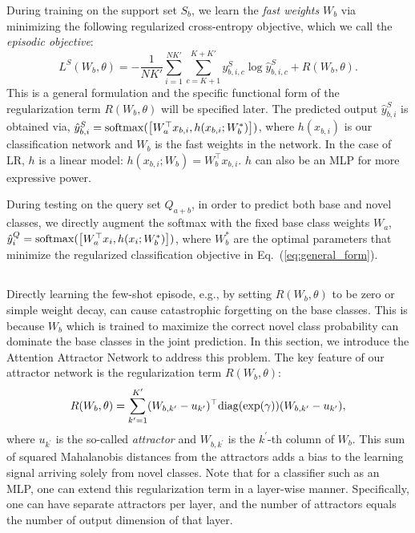 During training on the support set $S_b$, we learn the \textit{fast weights} $W_{b}$ via minimizing
the following regularized cross-entropy objective, which we call the {\it episodic objective}:
\begin{equation}
\label{eq:general_form}
L^{S}(W_{b}, \theta) = - \frac{1}{NK'}\sum_{i=1}^{N K'} \sum_{c=K+1}^{K+K'}
y_{b,i,c}^S \log \hat{y}_{b,i,c}^S  + R(W_b,\theta).
\end{equation}
This is a general formulation and the specific functional form of the regularization term
$R(W_b,\theta)$ will be specified later. The predicted output $\hat{y}_{b,i}^S$ is obtained via,
$\hat{y}_{b,i}^S = \mathrm{softmax}(\left[W_{a}^\top x_{b,i}, h(x_{b,i}; W_b^\ast) \right])$, where
$h(x_{b,i})$ is our classification network and $W_{b}$ is the fast weights in the network. In the
case of LR, $h$ is a linear model: $h(x_{b,i}; W_{b}) = W_b^\top x_{b,i}$. $h$ can also be an MLP
for more expressive power.

During testing on the query set $Q_{a+b}$, in order to predict both base and novel classes, we
directly augment the softmax with the fixed base class weights $W_a$, $\hat{y}_{i}^Q =
\mathrm{softmax}(\left[W_{a}^\top x_{i}, h(x_{i}; W_b^\ast) \right])$, where ${W}_{b}^{\ast}$ are the
optimal parameters that minimize the regularized classification objective in
Eq.~(\ref{eq:general_form}).

\subsection{\ourmodel}
Directly learning the few-shot episode, e.g., by setting $R(W_b,\theta)$ to be zero or simple
weight decay, can cause catastrophic forgetting on the base classes. This is because $W_b$ which is
trained to maximize the correct novel class probability can dominate the base classes in the joint
prediction. In this section, we introduce the Attention Attractor Network to address this problem.
The key feature of our attractor network is the regularization term $R(W_b, \theta)$:
\begin{equation}
R(W_b, \theta) = 
\sum_{k^{\prime} = 1}^{K^{\prime}} 
(W_{b,k^{\prime}} - u_{k^{\prime}})^\top \mathrm{diag}(\exp(\gamma)) (W_{b,k^{\prime}} - u_{k^{\prime}}),
\end{equation}
where $u_{k^{\prime}}$ is the so-called \textit{attractor} and $W_{b,k^{\prime}}$ is the
$k^{\prime}$-th column of $W_b$. This sum of squared Mahalanobis distances from the attractors adds
a bias to the learning signal arriving solely from novel classes. Note that for a classifier such as
an MLP, one can extend this regularization term in a layer-wise manner. Specifically, one can have
separate attractors per layer, and the number of attractors equals the number of output dimension
of that layer.

